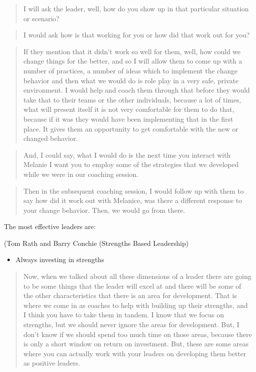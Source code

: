 \documentclass[]{book}
\begin{document}
\begin{quote}
I will ask the leader, well, how do you show up in that particular situation or scenario?
\end{quote}

\begin{quote}
I would ask how is that working for you or how did that work out for you?
\end{quote}

\begin{quote}
If they mention that it didn't work so well for them, well, how could we change things for the better, and so I will allow them to come up with a number of practices, a number of ideas which to implement the change behavior and then what we would do is role play in a very safe, private environment. I would help and coach them through that before they would take that to their teams or the other individuals, because a lot of times, what will present itself it is not very comfortable for them to do that, because if it was they would have been implementing that in the first place. It gives them an opportunity to get comfortable with the new or changed behavior.
\end{quote}

\begin{quote}
And, I could say, what I would do is the next time you interact with Melanie I want you to employ some of the strategies that we developed while we were in our coaching session.
\end{quote}

\begin{quote}
Then in the subsequent coaching session, I would follow up with them to say how did it work out with Melanice, was there a different response to your change behavior. Then, we would go from there.
\end{quote}

The most effective leaders are:

(Tom Rath and Barry Conchie (Strengths Based Leadership)

\begin{itemize}
\item
  Always investing in strengths
\end{itemize}

\begin{quote}
Now, when we talked about all these dimensions of a leader there are going to be some things that the leader will excel at and there will be some of the other characteristics that there is an area for development. That is where we come in as coaches to help with building up their strengths, and I think you have to take them in tandem. I know that we focus on strengths, but we should never ignore the areas for development. But, I don't know if we should spend too much time on those areas, because there is only a short window on return on investment. But, these are some areas where you can actually work with your leaders on developing them better as positive leaders.
\end{quote}
\end{document}
